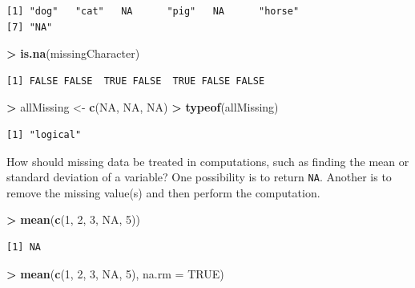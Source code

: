 \documentclass[]{krantz}
\makeatletter
\newenvironment{Shaded}{\begin{snugshade}}{\end{snugshade}}
\newcommand{\DataTypeTok}[1]{\textcolor[rgb]{0.27,0.27,0.27}{#1}}
\newcommand{\DecValTok}[1]{\textcolor[rgb]{0.06,0.06,0.06}{#1}}
\newcommand{\KeywordTok}[1]{\textcolor[rgb]{0.27,0.27,0.27}{\textbf{#1}}}
\newcommand{\NormalTok}[1]{#1}
\newcommand{\OperatorTok}[1]{\textcolor[rgb]{0.43,0.43,0.43}{\textbf{#1}}}
\newcommand{\OtherTok}[1]{\textcolor[rgb]{0.37,0.37,0.37}{#1}}
\newcommand{\StringTok}[1]{\textcolor[rgb]{0.5,0.5,0.5}{#1}}
\newenvironment{kframe}{%
\medskip{}
\setlength{\fboxsep}{.8em}
 \def\at@end@of@kframe{}%
 \ifinner\ifhmode%
  \def\at@end@of@kframe{\end{minipage}}%
  \begin{minipage}{\columnwidth}%
 \fi\fi%
 \def\FrameCommand##1{\hskip\@totalleftmargin \hskip-\fboxsep
 \colorbox{shadecolor}{##1}\hskip-\fboxsep
     \hskip-\linewidth \hskip-\@totalleftmargin \hskip\columnwidth}%
 \MakeFramed {\advance\hsize-\width
   \@totalleftmargin\z@ \linewidth\hsize
   \@setminipage}}%
 {\par\unskip\endMakeFramed%
 \at@end@of@kframe}
\renewenvironment{Shaded}{\begin{kframe}}{\end{kframe}}
\makeatother
\begin{document}
\begin{verbatim}
[1] "dog"   "cat"   NA      "pig"   NA      "horse"
[7] "NA"   
\end{verbatim}

\begin{Shaded}
\begin{Highlighting}[]
\OperatorTok{>}\StringTok{ }\KeywordTok{is.na}\NormalTok{(missingCharacter)}
\end{Highlighting}
\end{Shaded}

\begin{verbatim}
[1] FALSE FALSE  TRUE FALSE  TRUE FALSE FALSE
\end{verbatim}

\begin{Shaded}
\begin{Highlighting}[]
\OperatorTok{>}\StringTok{ }\NormalTok{allMissing <-}\StringTok{ }\KeywordTok{c}\NormalTok{(}\OtherTok{NA}\NormalTok{, }\OtherTok{NA}\NormalTok{, }\OtherTok{NA}\NormalTok{)}
\OperatorTok{>}\StringTok{ }\KeywordTok{typeof}\NormalTok{(allMissing)}
\end{Highlighting}
\end{Shaded}

\begin{verbatim}
[1] "logical"
\end{verbatim}

How should missing data be treated in computations, such as finding the mean or standard deviation of a variable? One possibility is to return \texttt{NA}. Another is to remove the missing value(s) and then perform the computation.

\begin{Shaded}
\begin{Highlighting}[]
\OperatorTok{>}\StringTok{ }\KeywordTok{mean}\NormalTok{(}\KeywordTok{c}\NormalTok{(}\DecValTok{1}\NormalTok{, }\DecValTok{2}\NormalTok{, }\DecValTok{3}\NormalTok{, }\OtherTok{NA}\NormalTok{, }\DecValTok{5}\NormalTok{))}
\end{Highlighting}
\end{Shaded}

\begin{verbatim}
[1] NA
\end{verbatim}

\begin{Shaded}
\begin{Highlighting}[]
\OperatorTok{>}\StringTok{ }\KeywordTok{mean}\NormalTok{(}\KeywordTok{c}\NormalTok{(}\DecValTok{1}\NormalTok{, }\DecValTok{2}\NormalTok{, }\DecValTok{3}\NormalTok{, }\OtherTok{NA}\NormalTok{, }\DecValTok{5}\NormalTok{), }\DataTypeTok{na.rm =} \OtherTok{TRUE}\NormalTok{)}
\end{Highlighting}
\end{Shaded}
\end{document}
